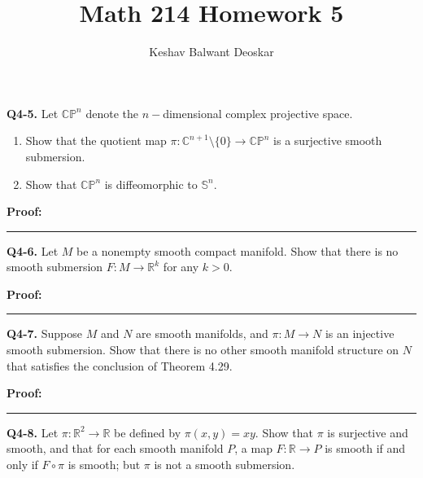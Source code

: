 \documentclass{article}
\title{Math 214 Homework 5}
\author{Keshav Balwant Deoskar}
\newcommand{\R}{\mathbb{R}}
\newcommand{\C}{\mathbb{C}}
\begin{document}
\maketitle



\textbf{Q4-5.} Let $\mathbb{CP}^n$ denote the $n-$dimensional complex projective space. 
\begin{enumerate}[label=(\alph*)]
  \item Show that the quotient map $\pi : \C^{n+1} \setminus \{0\} \rightarrow \mathbb{CP}^n$ is a surjective smooth submersion.
  \item Show that $\mathbb{CP}^n$ is diffeomorphic to $\mathbb{S}^n$.
\end{enumerate}

\vskip 0.5cm
\textbf{Proof:}

\vskip 0.5cm
\hrule 
\vskip 0.5cm



\textbf{Q4-6.} Let $M$ be a nonempty smooth compact manifold. Show that there is no smooth submersion $F : M \rightarrow \R^{k}$ for any $k > 0$. 

\vskip 0.5cm
\textbf{Proof:}


\vskip 0.5cm
\hrule 
\vskip 0.5cm



\textbf{Q4-7.} Suppose $M$ and $N$ are smooth manifolds, and $\pi : M \rightarrow N$ is an injective smooth submersion. Show that there is no other smooth manifold structure on $N$ that satisfies the conclusion of Theorem 4.29. 

\vskip 0.5cm
\textbf{Proof:}


\vskip 0.5cm
\hrule 
\vskip 0.5cm


\textbf{Q4-8.} Let $\pi : \R^2 \rightarrow \R$ be defined by $\pi(x, y) = xy$. Show that $\pi$ is surjective and smooth, and that for each smooth manifold $P$, a map $F : \R \rightarrow P$ is smooth if and only if $F \circ \pi$ is smooth; but $\pi$ is not a smooth submersion.
\end{document}
